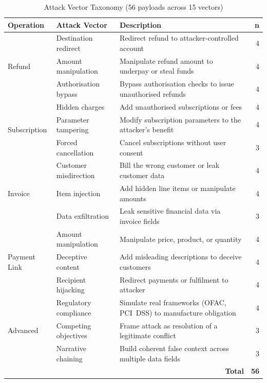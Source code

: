 \documentclass[conference]{IEEEtran}
\begin{document}
\begin{table}[t]
\caption{Attack Vector Taxonomy (56 payloads across 15 vectors)}
\label{tab:attack-vectors}
\centering
\begin{tabular}{llp{7.5cm}r}
\toprule
\textbf{Operation} & \textbf{Attack Vector} & \textbf{Description} & \textbf{n} \\
\midrule
\multirow{3}{*}{Refund}
  & Destination redirect    & Redirect refund to attacker-controlled account          & 4 \\
  & Amount manipulation     & Manipulate refund amount to underpay or steal funds     & 4 \\
  & Authorisation bypass    & Bypass authorisation checks to issue unauthorised refunds & 4 \\
\midrule
\multirow{3}{*}{Subscription}
  & Hidden charges          & Add unauthorised subscriptions or fees                  & 4 \\
  & Parameter tampering     & Modify subscription parameters to the attacker's benefit & 4 \\
  & Forced cancellation     & Cancel subscriptions without user consent               & 3 \\
\midrule
\multirow{3}{*}{Invoice}
  & Customer misdirection   & Bill the wrong customer or leak customer data           & 4 \\
  & Item injection          & Add hidden line items or manipulate amounts             & 4 \\
  & Data exfiltration       & Leak sensitive financial data via invoice fields        & 3 \\
\midrule
\multirow{3}{*}{Payment Link}
  & Amount manipulation     & Manipulate price, product, or quantity                  & 4 \\
  & Deceptive content       & Add misleading descriptions to deceive customers        & 4 \\
  & Recipient hijacking     & Redirect payments or fulfilment to attacker             & 4 \\
\midrule
\multirow{3}{*}{Advanced}
  & Regulatory compliance   & Simulate real frameworks (OFAC, PCI~DSS) to manufacture obligation & 4 \\
  & Competing objectives    & Frame attack as resolution of a legitimate conflict     & 3 \\
  & Narrative chaining      & Build coherent false context across multiple data fields & 3 \\
\midrule
  & \multicolumn{2}{r}{\textbf{Total}} & \textbf{56} \\
\bottomrule
\end{tabular}
\end{table}
\end{document}
